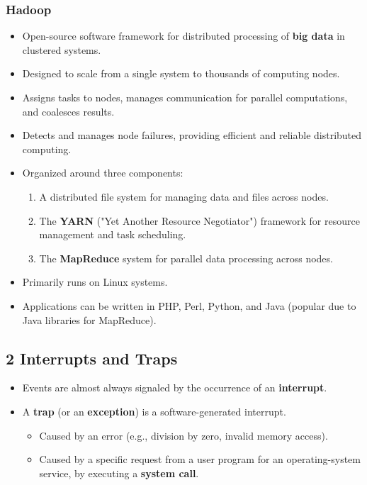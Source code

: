 \documentclass{article}
\begin{document}
\subsubsection*{Hadoop}
\begin{itemize}
    \item Open-source software framework for distributed processing of \textbf{big data} in clustered systems.
    \item Designed to scale from a single system to thousands of computing nodes.
    \item Assigns tasks to nodes, manages communication for parallel computations, and coalesces results.
    \item Detects and manages node failures, providing efficient and reliable distributed computing.
    \item Organized around three components:
    \begin{enumerate}
        \item A distributed file system for managing data and files across nodes.
        \item The \textbf{YARN} ("Yet Another Resource Negotiator") framework for resource management and task scheduling.
        \item The \textbf{MapReduce} system for parallel data processing across nodes.
    \end{enumerate}
    \item Primarily runs on Linux systems.
    \item Applications can be written in PHP, Perl, Python, and Java (popular due to Java libraries for MapReduce).
\end{itemize}

\subsection*{2 Interrupts and Traps}
\begin{itemize}
    \item Events are almost always signaled by the occurrence of an \textbf{interrupt}.
    \item A \textbf{trap} (or an \textbf{exception}) is a software-generated interrupt.
    \begin{itemize}
        \item Caused by an error (e.g., division by zero, invalid memory access).
        \item Caused by a specific request from a user program for an operating-system service, by executing a \textbf{system call}.
    \end{itemize}
\end{itemize}
\end{document}
